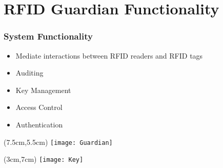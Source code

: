 \section{RFID Guardian Functionality}

\begin{frame}
 \frametitle{System Functionality}

 \begin{itemize}
  \item Mediate interactions between RFID readers and RFID tags
  \item Auditing
  \item Key Management
  \item Access Control
  \item Authentication
 \end{itemize}

 \begin{textblock*}{5cm}(7.5cm,5.5cm)
  \texttt{[image: Guardian]}
 \end{textblock*}


 \begin{textblock*}{5cm}(3cm,7cm)
  \texttt{[image: Key]}
 \end{textblock*}


\end{frame}
